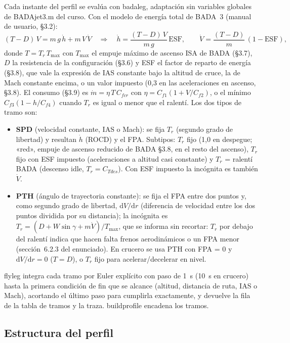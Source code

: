\documentclass[11pt,a4paper]{article}
\DeclareRobustCommand{\m}[1]{{\ttfamily\def\_{\textunderscore\penalty100\relax}#1}}
\begin{document}
Cada instante del perfil se evalúa con \m{bada\_leg}, adaptación sin variables globales de \m{BADA\_jet3.m} del curso. Con el modelo de energía total de BADA~3 (manual de usuario, §3.2):
\begin{equation}
(T-D)\,V = m\,g\,\dot h + m\,V\,\dot V \quad\Longrightarrow\quad
\dot h = \frac{(T-D)\,V}{m\,g}\,\mathrm{ESF},\qquad \dot V = \frac{(T-D)}{m}\,(1-\mathrm{ESF}),
\end{equation}
donde $T=T_r\,T_{\max}$ con $T_{\max}$ el empuje máximo de ascenso ISA de BADA (§3.7), $D$ la resistencia de la configuración (§3.6) y ESF el factor de reparto de energía (§3.8), que vale la expresión de IAS constante bajo la altitud de cruce, la de Mach constante encima, o un valor impuesto (0,3 en las aceleraciones en ascenso, §3.8). El consumo (§3.9) es $\dot m = \eta\,T\,C_{fcr}$ con $\eta=C_{f1}(1+V/C_{f2})$, o el mínimo $C_{f3}(1-h/C_{f4})$ cuando $T_r$ es igual o menor que el ralentí. Los dos tipos de tramo son:
\begin{itemize}
\item \textbf{SPD} (velocidad constante, IAS o Mach): se fija $T_r$ (segundo grado de libertad) y resultan $\dot h$ (ROCD) y el FPA. Subtipos: $T_r$ fijo (1,0 en despegue; «red», empuje de ascenso reducido de BADA §3.8, en el resto del ascenso), $T_r$ fijo con ESF impuesto (aceleraciones a altitud casi constante) y $T_r$ = ralentí BADA (descenso idle, $T_r = C_{Tdes}$). Con ESF impuesto la incógnita es también $\dot V$.
\item \textbf{PTH} (ángulo de trayectoria constante): se fija el FPA entre dos puntos y, como segundo grado de libertad, $\mathrm{d}V/\mathrm{d}r$ (diferencia de velocidad entre los dos puntos dividida por su distancia); la incógnita es $T_r = (D + W\sin\gamma + m\dot V)/T_{\max}$, que se informa sin recortar: $T_r$ por debajo del ralentí indica que hacen falta frenos aerodinámicos o un FPA menor (sección~6.2.3 del enunciado). En crucero se usa PTH con FPA = 0 y $\mathrm{d}V/\mathrm{d}r=0$ ($T=D$), o $T_r$ fijo para acelerar/decelerar en nivel.
\end{itemize}
\m{fly\_leg} integra cada tramo por Euler explícito con paso de 1~s (10~s en crucero) hasta la primera condición de fin que se alcance (altitud, distancia de ruta, IAS o Mach), acortando el último paso para cumplirla exactamente, y devuelve la fila de la tabla de tramos y la traza. \m{build\_profile} encadena los tramos.

\subsection{Estructura del perfil}
\end{document}
